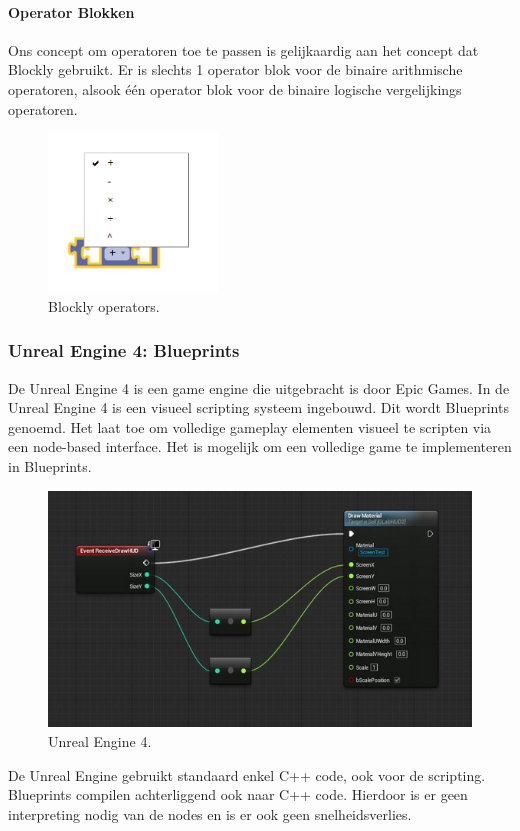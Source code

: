 \documentclass[]{article}
\begin{document}
\paragraph{Operator Blokken}
Ons concept om operatoren toe te passen is gelijkaardig aan het concept dat Blockly gebruikt. Er is slechts 1 operator blok voor de binaire arithmische operatoren, alsook \'{e}\'{e}n operator blok voor de binaire logische vergelijkings operatoren. 
\begin{figure}[H]
\centering
\includegraphics[width=0.4\textwidth]{./BestaandeSoftware/blocklyopp.PNG}
\caption{Blockly operators.}
\end{figure}
\subsubsection{Unreal Engine 4: Blueprints}
De Unreal Engine 4 \cite{unreal} is een game engine die uitgebracht is door Epic Games. In de Unreal Engine 4 is een visueel scripting systeem ingebouwd. Dit wordt Blueprints genoemd. Het laat toe om volledige gameplay elementen visueel te scripten via een node-based interface. Het is mogelijk om een volledige game te implementeren in Blueprints.
\begin{figure}[H]
\centering
\includegraphics[width=1.1\textwidth]{./BestaandeSoftware/unrealEngine.PNG}
\caption{Unreal Engine 4.}
\end{figure}
De Unreal Engine gebruikt standaard enkel C++ code, ook voor de scripting. Blueprints compilen achterliggend ook naar C++ code. Hierdoor is er geen interpreting nodig van de nodes en is er ook geen snelheidsverlies.
\end{document}
